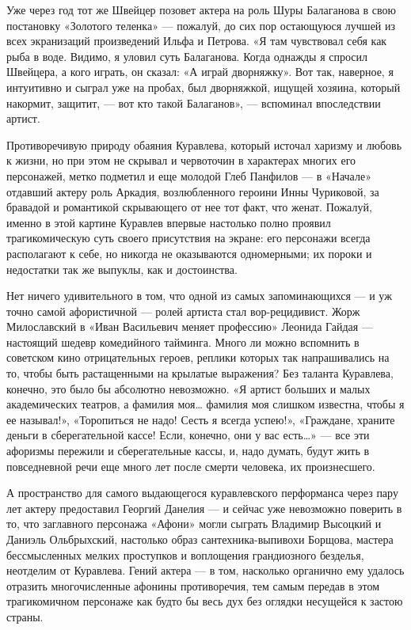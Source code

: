 
Уже через год тот же Швейцер позовет актера на роль Шуры Балаганова в свою
постановку «Золотого теленка» — пожалуй, до сих пор остающуюся лучшей из всех
экранизаций произведений Ильфа и Петрова. «Я там чувствовал себя как рыба в
воде. Видимо, я уловил суть Балаганова. Когда однажды я спросил Швейцера, а
кого играть, он сказал: «А играй дворняжку». Вот так, наверное, я интуитивно и
сыграл уже на пробах, был дворняжкой, ищущей хозяина, который накормит,
защитит, — вот кто такой Балаганов», — вспоминал впоследствии артист.

Противоречивую природу обаяния Куравлева, который источал харизму и любовь к
жизни, но при этом не скрывал и червоточин в характерах многих его персонажей,
метко подметил и еще молодой Глеб Панфилов — в «Начале» отдавший актеру роль
Аркадия, возлюбленного героини Инны Чуриковой, за бравадой и романтикой
скрывающего от нее тот факт, что женат. Пожалуй, именно в этой картине Куравлев
впервые настолько полно проявил трагикомическую суть своего присутствия на
экране: его персонажи всегда располагают к себе, но никогда не оказываются
одномерными; их пороки и недостатки так же выпуклы, как и достоинства.


Нет ничего удивительного в том, что одной из самых запоминающихся — и уж точно
самой афористичной — ролей артиста стал вор-рецидивист. Жорж Милославский в
«Иван Васильевич меняет профессию» Леонида Гайдая — настоящий шедевр
комедийного тайминга. Много ли можно вспомнить в советском кино отрицательных
героев, реплики которых так напрашивались на то, чтобы быть растащенными на
крылатые выражения? Без таланта Куравлева, конечно, это было бы абсолютно
невозможно. «Я артист больших и малых академических театров, а фамилия моя…
фамилия моя слишком известна, чтобы я ее называл!», «Торопиться не надо! Сесть
я всегда успею!», «Граждане, храните деньги в сберегательной кассе! Если,
конечно, они у вас есть…» — все эти афоризмы пережили и сберегательные кассы,
и, надо думать, будут жить в повседневной речи еще много лет после смерти
человека, их произнесшего.

А пространство для самого выдающегося куравлевского перформанса через пару лет
актеру предоставил Георгий Данелия — и сейчас уже невозможно поверить в то, что
заглавного персонажа «Афони» могли сыграть Владимир Высоцкий и Даниэль
Ольбрыхский, настолько образ сантехника-выпивохи Борщова, мастера бессмысленных
мелких проступков и воплощения грандиозного безделья, неотделим от Куравлева.
Гений актера — в том, насколько органично ему удалось отразить многочисленные
афонины противоречия, тем самым передав в этом трагикомичном персонаже как
будто бы весь дух без оглядки несущейся к застою страны.

